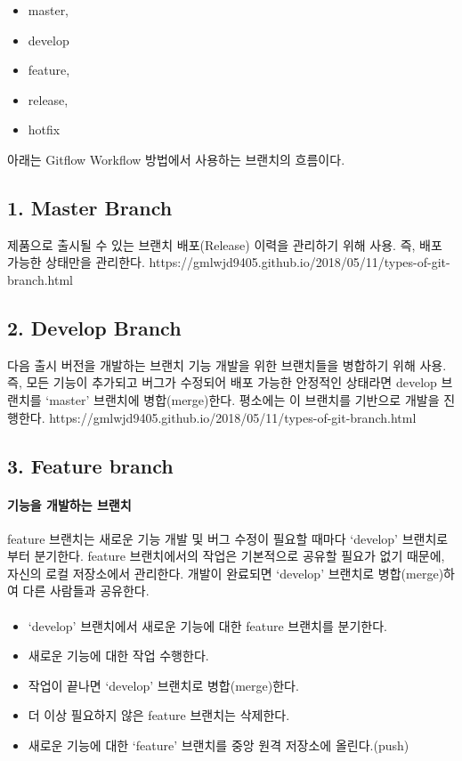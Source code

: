 \documentclass[12pt, a4paper, oneside]{book}
\begin{document}
			\begin{itemize}	[	
							topsep=0.0em,
							itemsep=0.0em,
							leftmargin=6em, 
							labelsep=3em 
							]
				\item	master,
				\item	develop
				\item	feature, 
				\item	release, 
				\item	hotfix
			\end{itemize}
아래는 Gitflow Workflow 방법에서 사용하는 브랜치의 흐름이다.


	\subsection{1. Master Branch}
		제품으로 출시될 수 있는 브랜치
		배포(Release) 이력을 관리하기 위해 사용. 즉, 배포 가능한 상태만을 관리한다.
		https://gmlwjd9405.github.io/2018/05/11/types-of-git-branch.html

	\subsection{2. Develop Branch}
다음 출시 버전을 개발하는 브랜치
기능 개발을 위한 브랜치들을 병합하기 위해 사용. 즉, 모든 기능이 추가되고 버그가 수정되어 배포 가능한 안정적인 상태라면 develop 브랜치를 ‘master’ 브랜치에 병합(merge)한다.
평소에는 이 브랜치를 기반으로 개발을 진행한다.
https://gmlwjd9405.github.io/2018/05/11/types-of-git-branch.html


	\subsection{3. Feature branch}

		\paragraph{기능을 개발하는 브랜치}
		feature 브랜치는 새로운 기능 개발 및 버그 수정이 필요할 때마다 ‘develop’ 브랜치로부터 분기한다. 
		feature 브랜치에서의 작업은 기본적으로 공유할 필요가 없기 때문에, 자신의 로컬 저장소에서 관리한다.
		개발이 완료되면 ‘develop’ 브랜치로 병합(merge)하여 다른 사람들과 공유한다.
		
		\paragraph{}

		\begin{itemize}
			\item		‘develop’ 브랜치에서 새로운 기능에 대한 feature 브랜치를 분기한다.
			\item		새로운 기능에 대한 작업 수행한다.
			\item		작업이 끝나면 ‘develop’ 브랜치로 병합(merge)한다.
			\item		더 이상 필요하지 않은 feature 브랜치는 삭제한다.
			\item		새로운 기능에 대한 ‘feature’ 브랜치를 중앙 원격 저장소에 올린다.(push)
		\end{itemize}
\end{document}
